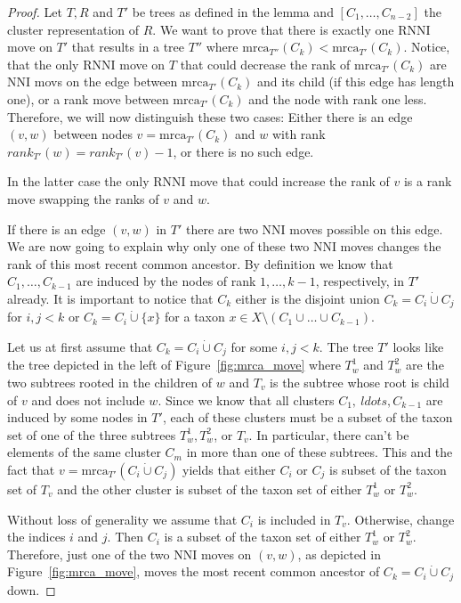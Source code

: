 \documentclass{amsart}
\newcommand{\mrca}{\mathrm{mrca}}
\newcommand{\nni}{\mathrm{NNI}}
\newcommand{\rnni}{\mathrm{RNNI}}
\begin{document}
\begin{proof}


    Let $T, R$ and $T'$ be trees as defined in the lemma and $[C_1, \ldots, C_{n-2}]$ the cluster representation of $R$.
    We want to prove that there is exactly one $\rnni$ move on $T'$ that results in a tree $T''$ where $\mrca_{T''}(C_k) < \mrca_{T'}(C_k)$.
    Notice, that the only $\rnni$ move on $T$ that could decrease the rank of $\mrca_{T'}(C_k)$ are $\nni$ movs on the edge between $\mrca_{T'}(C_k)$ and its child (if this edge has length one), or a rank move between $\mrca_{T'}(C_k)$ and the node with rank one less.
    Therefore, we will now distinguish these two cases:
    Either there is an edge $(v,w)$ between nodes $v = \mrca_{T'}(C_k)$ and $w$ with rank $rank_{T'}(w) = rank_{T'}(v) - 1$, or there is no such edge.

    In the latter case the only $\rnni$ move that could increase the rank of $v$ is a rank move swapping the ranks of $v$ and $w$.

    If there is an edge $(v,w)$ in $T'$ there are two $\nni$ moves possible on this edge.
    We are now going to explain why only one of these two $\nni$ moves changes the rank of this most recent common ancestor.
    By definition we know that $C_1, \ldots, C_{k-1}$ are induced by the nodes of rank $1, \ldots, k-1$, respectively, in $T'$ already.
    It is important to notice that $C_k$ either is the disjoint union $C_k = C_i \dot\cup C_j$ for $i,j < k$ or $C_k = C_i \dot\cup \{x\}$ for a taxon $x \in X \setminus (C_1 \cup \ldots \cup C_{k-1})$.

    Let us at first assume that $C_k = C_i \dot\cup C_j$ for some $i,j < k$.
    The tree $T'$ looks like the tree depicted in the left of Figure~\ref{fig:mrca_move} where $T_w^1$ and $T_w^2$ are the two subtrees rooted in the children of $w$ and $T_v$ is the subtree whose root is child of $v$ and does not include $w$.
    Since we know that all clusters $C_1,\ ldots, C_{k-1}$ are induced by some nodes in $T'$, each of these clusters must be a subset of the taxon set of one of the three subtrees $T_w^1,T_w^2$, or $T_v$.
    In particular, there can't be elements of the same cluster $C_m$ in more than one of these subtrees.
    This and the fact that $v = \mrca_{T'}(C_i \dot\cup C_j)$ yields that either $C_i$ or $C_j$ is subset of the taxon set of $T_v$ and the other cluster is subset of the taxon set of either $T_w^1$ or $T_w^2$.

    Without loss of generality we assume that $C_i$ is included in $T_v$.
    Otherwise, change the indices $i$ and $j$.
    Then $C_i$ is a subset of the taxon set of either $T_w^1$ or $T_w^2$.
    Therefore, just one of the two $\nni$ moves on $(v,w)$, as depicted in Figure~\ref{fig:mrca_move}, moves the most recent common ancestor of $C_k = C_i \dot \cup C_j$ down.


\end{proof}
\end{document}
